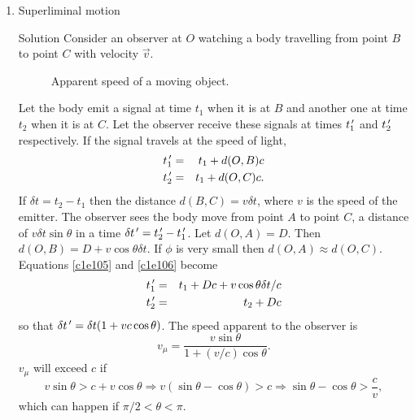 \begin{enumerate}
\item Superliminal motion \cite{pg}
\item[Solution] Consider an observer at $O$ watching a body travelling from
point $B$ to point $C$ with velocity $\vec{v}$. 
\begin{figure}
\centering
{}
\caption{Apparent speed of a moving object.}
\end{figure}

Let the body emit a signal at time $t_1$ when it is at $B$ and another one at
time $t_2$ when it is at $C$. Let the observer receive these signals at times
$t_1^{\,\prime}$ and $t_2^{\,\prime}$ respectively. If the signal travels at the speed of
light,
\begin{eqnarray}
t_1^{\,\prime} &=& t_1 + d(O, B)c \label{c1e105} \\
t_2^{\,\prime} &=& t_1 + d(O, C)c. \label{c1e106}
\end{eqnarray}
If $\delta t = t_2 - t_1$ then the distance $d(B, C) = v\delta t$, where $v$
is the speed of the emitter. The observer sees the body move from point $A$
to point $C$, a distance of $v\delta t\sin\theta$ in a time $\delta t^{\,\prime} =
t_2^{\,\prime} - t_1^{\,\prime}$. Let $d(O, A)=D$. Then $d(O, B) = D + v\cos\theta\delta t$.
If $\phi$ is very small then $d(O, A) \approx d(O, C)$. Equations \eqref{c1e105}
and \eqref{c1e106} become
\begin{eqnarray}
t_1^{\,\prime} &=& t_1 + Dc + v\cos\theta\delta t/c \label{c1e107} \\
t_2^{\,\prime} &=& t_2 + Dc \label{c1e108}
\end{eqnarray}
so that $\delta t^{\,\prime} = \delta t(1  + vc\cos\theta)$. The speed apparent to
the observer is 
\begin{equation}\label{c1e109}
v_\mu = \frac{v\sin\theta}{1 + (v/c)\cos\theta}.
\end{equation}
$v_\mu$ will exceed $c$ if
\[
v\sin\theta > c + v\cos\theta \Rightarrow v(\sin\theta - \cos\theta) > c
\Rightarrow \sin\theta - \cos\theta > \frac{c}{v},
\]
which can happen if $\pi/2 < \theta < \pi$.
\end{enumerate}
